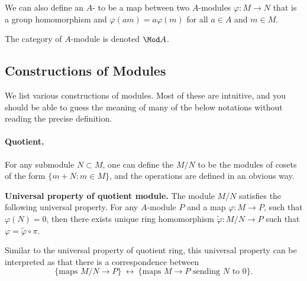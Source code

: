 We can also define an $A$-
to be a map between two $A$-modules $\varphi : M\to N$
that is a group homomorphism and
$\varphi(am) = a\varphi(m)$ for all $a\in A$ and $m\in M$.

The category of $A$-module is denoted $\Mod A$.
%
%
%
%
\subsection{Constructions of Modules}
We list various constructions of modules.
Most of these are intuitive, and you should be 
able to guess the meaning of many of the below notations 
without reading the precise definition.

\paragraph{Quotient.}
For any submodule $N\subset M$,
one can define the 
$M/N$ 
to be the modules of cosets of the form $\{m+N : m\in M\}$,
and the operations are defined in an obvious way.


\textbf{Universal property of quotient module.}
The module $M/N$ satisfies the following universal property.
For any $A$-module $P$ and a map $\varphi : M\to P$,
such that $\varphi(N)=0$, then there exists unique
ring homomorphism $\widetilde\varphi : M/N\to P$
such that $\varphi=\widetilde\varphi\circ\pi$.
\begin{center}
\end{center}
Similar to the universal property of quotient ring,
this universal property can be interpreted as that 
there is a correspondence between 
$$\{\text{maps }M/N\to P\}\ \longleftrightarrow\ 
\{\text{maps }M\to P\text{ sending }N\text{ to }0\}.$$

